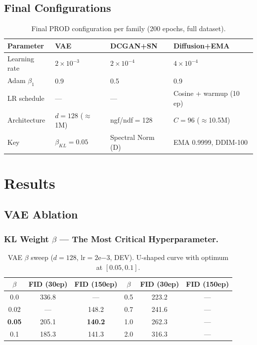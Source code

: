 \documentclass[runningheads]{llncs}
\begin{document}
\subsection{Final Configurations}

\begin{table}[htbp]
\caption{Final PROD configuration per family (200 epochs, full dataset).}\label{tab:hp_final}
\centering\small
\begin{tabular}{llll}
\toprule
Parameter & VAE & DCGAN+SN & Diffusion+EMA \\
\midrule
Learning rate & $2{\times}10^{-3}$ & $2{\times}10^{-4}$ & $4{\times}10^{-4}$ \\
Adam $\beta_1$ & 0.9 & 0.5 & 0.9 \\
LR schedule & --- & --- & Cosine + warmup (10 ep) \\
Architecture & $d=128$ ($\approx$1M) & ngf/ndf$=$128 & $C=96$ ($\approx$10.5M) \\
Key & $\beta_{KL}=0.05$ & Spectral Norm (D) & EMA 0.9999, DDIM-100 \\
\bottomrule
\end{tabular}
\end{table}

\section{Results}\label{sec:results}

\subsection{VAE Ablation}\label{sec:vae_ablation}

\subsubsection{KL Weight $\beta$ --- The Most Critical Hyperparameter.}

\begin{table}[htbp]
\caption{VAE $\beta$ sweep ($d=128$, lr$=2$e$-3$, DEV). U-shaped curve with optimum at $[0.05, 0.1]$.}\label{tab:vae_beta}
\centering\small
\begin{tabular}{ccc|ccc}
\toprule
$\beta$ & FID (30ep) & FID (150ep) & $\beta$ & FID (30ep) & FID (150ep) \\
\midrule
0.0  & 336.8 & --- & 0.5 & 223.2 & --- \\
0.02 & ---   & 148.2 & 0.7 & 241.6 & --- \\
\textbf{0.05} & 205.1 & \textbf{140.2} & 1.0 & 262.3 & --- \\
0.1  & 185.3 & 141.3 & 2.0 & 316.3 & --- \\
\bottomrule
\end{tabular}
\end{table}
\end{document}
